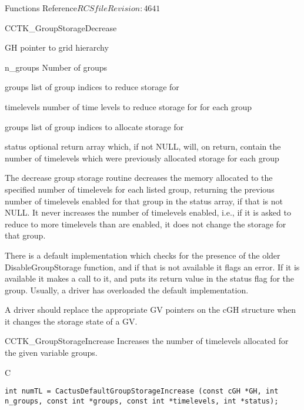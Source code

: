 \begin{cactuspart}{ Functions Reference}{$RCSfile$}{$Revision: 4641 $}
\begin{FunctionDescription}{CCTK\_GroupStorageDecrease}
\begin{ParameterSection}
\begin{Parameter}{GH}
pointer to grid hierarchy
\end{Parameter}
\begin{Parameter}{n\_groups}
Number of groups
\end{Parameter}
\begin{Parameter}{groups}
list of group indices to reduce storage for
\end{Parameter}
\begin{Parameter}{timelevels}
number of time levels to reduce storage for for each group
\end{Parameter}
\begin{Parameter}{groups}
list of group indices to allocate storage for
\end{Parameter}
\begin{Parameter}{status}
  optional return array which, if not NULL, will, on return, contain
  the number of timelevels which were previously allocated storage for
  each group
\end{Parameter}
\end{ParameterSection}

\begin{Discussion}
  The decrease group storage routine decreases the memory allocated to
  the specified number of timelevels for each listed group, returning
  the previous number of timelevels enabled for that group in the
  status array, if that is not NULL.  It never increases the number of
  timelevels enabled, i.e., if it is asked to reduce to more
  timelevels than are enabled, it does not change the storage for that
  group.

  There is a default implementation which checks for the presence of
  the older DisableGroupStorage function, and if that is not available
  it flags an error.  If it is available it makes a call to it, and
  puts its return value in the status flag for the group.  Usually, a
  driver has overloaded the default implementation.

  A driver should replace the appropriate GV pointers on the cGH
  structure when it changes the storage state of a GV.
\end{Discussion}
\end{FunctionDescription}


\begin{FunctionDescription}{CCTK\_GroupStorageIncrease}
\label{CCTK-GroupStorageIncrease}
Increases the number of timelevels allocated for the given variable groups.
\begin{SynopsisSection}
\begin{Synopsis}{C}
\begin{verbatim}int numTL = CactusDefaultGroupStorageIncrease (const cGH *GH, int n_groups, const int *groups, const int *timelevels, int *status);\end{verbatim}
\end{Synopsis}
\end{SynopsisSection}


\end{FunctionDescription}
\end{cactuspart}
